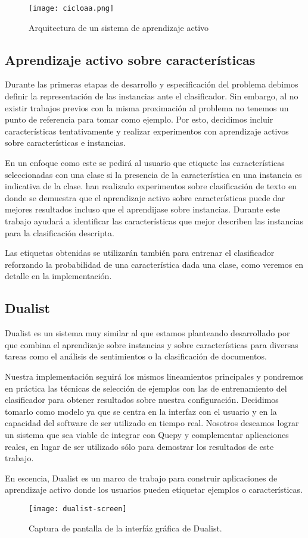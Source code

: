 \begin{figure}[h]
\caption{Arquitectura de un sistema de aprendizaje activo}
\texttt{[image: cicloaa.png]}
\centering
\end{figure}

\subsection{Aprendizaje activo sobre características}

Durante las primeras etapas de desarrollo y especificación del problema debimos definir la representación de las instancias ante el clasificador. Sin embargo, al no existir trabajos previos con la misma proximación al problema no tenemos un punto de referencia para tomar como ejemplo. Por esto, decidimos incluir características tentativamente y realizar experimentos con aprendizaje activos sobre características e instancias.

En un enfoque como este se pedirá al usuario que etiquete las características seleccionadas con una clase si la presencia de la característica en una instancia es indicativa de la clase. \citet{settles-al-features} han realizado experimentos sobre clasificación de texto en donde se demuestra que el aprendizaje activo sobre características puede dar mejores resultados incluso que el aprendijase sobre instancias. Durante este trabajo ayudará a identificar las características que mejor describen las instancias para la clasificación descripta.

Las etiquetas obtenidas se utilizarán también para entrenar el clasificador reforzando la probabilidad de una característica dada una clase, como veremos en detalle en la implementación.

\subsection{Dualist}

Dualist es un sistema muy similar al que estamos planteando desarrollado por \citet{dualist} que combina el aprendizaje sobre instancias y sobre características para diversas tareas como el análisis de sentimientos o la clasificación de documentos.

Nuestra implementación seguirá los mismos lineamientos principales y pondremos en práctica las técnicas de selección de ejemplos con las de entrenamiento del clasificador para obtener resultados sobre nuestra configuración. Decidimos tomarlo como modelo ya que se centra en la interfaz con el usuario y en la capacidad del software de ser utilizado en tiempo real. Nosotros deseamos lograr un sistema que sea viable de integrar con Quepy y complementar aplicaciones reales, en lugar de ser utilizado sólo para demostrar los resultados de este trabajo.

En escencia, Dualist es un marco de trabajo para construir aplicaciones de aprendizaje activo donde los usuarios pueden etiquetar ejemplos o características.

\begin{figure}
\caption{Captura de pantalla de la interfáz gráfica de Dualist.}
\texttt{[image: dualist-screen]}
\centering
\end{figure}